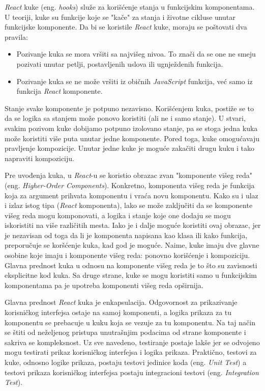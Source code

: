 \textit{React} kuke (eng. \textit{hooks}) služe za korišćenje stanja u funkcijskim komponentama. U teoriji, kuke su funkcije 
koje se "kače" za stanja i životne cikluse unutar funkcijske komponente. Da bi se koristile \textit{React} kuke, moraju se 
poštovati dva pravila:
\begin{itemize}
    \item Pozivanje kuka se mora vršiti sa najvišeg nivoa. To znači da se one ne smeju pozivati unutar petlji, 
    postavljenih uslova ili ugnježdenih funkcija.
    \item Pozivanje kuka se ne može vršiti iz običnih \textit{JavaScript} funkcija, već samo iz funkcija \textit{React} komponente.
\end{itemize}

Stanje svake komponente je potpuno nezavisno. Korišćenjem kuka, postiže se to da se logika sa stanjem može ponovo koristiti 
(ali ne i samo stanje). U stvari, svakim pozivom kuke dobijamo potpuno izolovano stanje, pa se stoga jedna kuka može koristiti 
više puta unutar jedne komponente. Pored toga, kuke omogućavaju pravljenje kompozicije. Unutar jedne kuke je moguće zakačiti 
drugu kuku i tako napraviti kompoziciju. 

Pre uvođenja kuka, u \textit{React}-u se koristio obrazac zvan "komponente višeg reda" (eng. \textit{Higher-Order Components}). 
Konkretno, komponenta višeg reda je funkcija koja za argument prihvata komponentu i vraća novu komponentu. Kako su i ulaz i 
izlaz istog tipa (\textit{React} komponenta), lako se može zaključiti da se komponente višeg reda mogu komponovati, a logika i 
stanje koje one dodaju se mogu iskoristiti na više različitih mesta. Iako je i dalje moguće koristiti ovaj obrazac, jer je 
nezavisan od toga da li je komponenta napisana kao klasa ili kako funkcija, preporučuje se koršćenje kuka, kad god je moguće. 
Naime, kuke imaju dve glavne osobine koje imaju i komponente višeg reda: ponovno korišćenje i kompoziciju. Glavna prednost kuka 
u odnosu na komponente višeg reda je to što su zavisnosti eksplicitne kod kuka. Sa druge strane, kuke se mogu koristiti samo u 
funkcijskim komponentama pa je upotreba komponenti višeg reda opširnija.

Glavna prednost \textit{React} kuka je enkapsulacija. Odgovornost za prikazivanje korisničkog interfejsa ostaje na samoj 
komponenti, a logika prikaza za tu komponentu se prebacuje u kuku koja se vezuje za tu komponentu. Na taj način se štiti 
od neželjenog pristupa unutrašnjim podacima od strane komponente i sakriva se kompleksnost. Uz sve navedeno, 
testiranje postaje lakše jer se odvojeno mogu testirati prikaz korisničkog interfejsa i logika prikaza. Praktično,
testovi za kuke, odnosno logike prikaza, postaju testovi jedinice koda (eng. \textit{Unit Test}) a testovi prikaza
korisničkog interfejsa postaju integracioni testovi (eng. \textit{Integration Test}).


